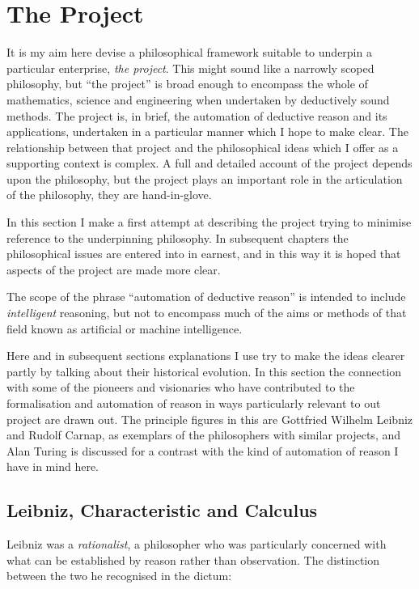 
\chapter{The Project}\label{TheProject}

It is my aim here devise a philosophical framework suitable to
underpin a particular enterprise, \emph{the project}. 
This might sound like a narrowly scoped philosophy, but ``the
project'' is broad enough to encompass the whole of mathematics,
science and engineering when undertaken by deductively sound methods. 
The project is, in brief, the automation of deductive reason and its
applications, undertaken in a particular manner which I hope to make
clear. 
The relationship between that project and the philosophical ideas
which I offer as a supporting context is complex. 
A full and detailed account of the project depends upon the
philosophy, but the project plays an important role in the
articulation of the philosophy, they are hand-in-glove. 

In this section I make a first attempt at describing the project
trying to minimise reference to the underpinning philosophy. 
In subsequent chapters the philosophical issues are entered into in
earnest, and in this way it is hoped that aspects of the project are
made more clear. 

The scope of the phrase ``automation of deductive reason'' is intended
to include \emph{intelligent} reasoning, but not to encompass much of
the aims or methods of that field known as artificial or machine
intelligence. 

Here and in subsequent sections explanations I use try to make the
ideas clearer partly by talking about their historical evolution. 
In this section the connection with some of the pioneers and
visionaries who have contributed to the formalisation and automation
of reason in ways particularly relevant to out project are drawn out. 
The principle figures in this are Gottfried Wilhelm Leibniz and Rudolf
Carnap, as exemplars of the philosophers with similar projects, and
Alan Turing is discussed for a contrast with the kind of automation of
reason I have in mind here. 

\section{Leibniz, Characteristic and Calculus}

Leibniz was a \emph{rationalist}, a philosopher who was particularly
concerned with what can be established by reason rather than
observation. 
The distinction between the two he recognised in the dictum:

